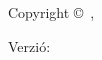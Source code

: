 \pagestyle{plain}
\thispagestyle{empty}
\begin{center}
\textsc{\theauthor}

\textsc{\thetitle}
\end{center}

\newpage\thispagestyle{empty}

Copyright \copyright~\theauthor, \thedate

Verzió: \commiturl

\maketitle
\newpage\thispagestyle{empty}

\cleardoublepage
\thispagestyle{empty}
\setcounter{page}{5}
\tableofcontents
